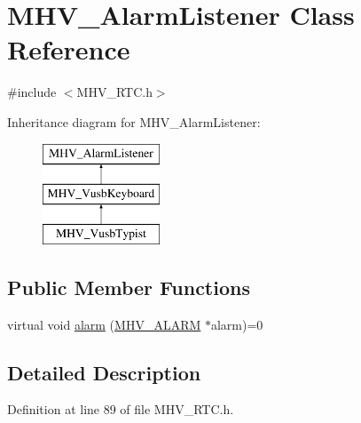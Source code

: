 \hypertarget{class_m_h_v___alarm_listener}{
\section{\-M\-H\-V\-\_\-\-Alarm\-Listener \-Class \-Reference}
\label{class_m_h_v___alarm_listener}
}


{\ttfamily \#include $<$\-M\-H\-V\-\_\-\-R\-T\-C.\-h$>$}

\-Inheritance diagram for \-M\-H\-V\-\_\-\-Alarm\-Listener\-:\begin{figure}[H]
\begin{center}
\leavevmode
\includegraphics[height=3.000000cm]{class_m_h_v___alarm_listener}
\end{center}
\end{figure}
\subsection*{\-Public \-Member \-Functions}
\begin{DoxyCompactItemize}
\item 
virtual void \hyperlink{class_m_h_v___alarm_listener_ae2b93b59b59e39ba0f80d4e8690cfaea}{alarm} (\hyperlink{_m_h_v___r_t_c_8h_af13307658f41fba330ffae04dd5cbce6}{\-M\-H\-V\-\_\-\-A\-L\-A\-R\-M} $\ast$alarm)=0
\end{DoxyCompactItemize}


\subsection{\-Detailed \-Description}


\-Definition at line 89 of file \-M\-H\-V\-\_\-\-R\-T\-C.\-h.



